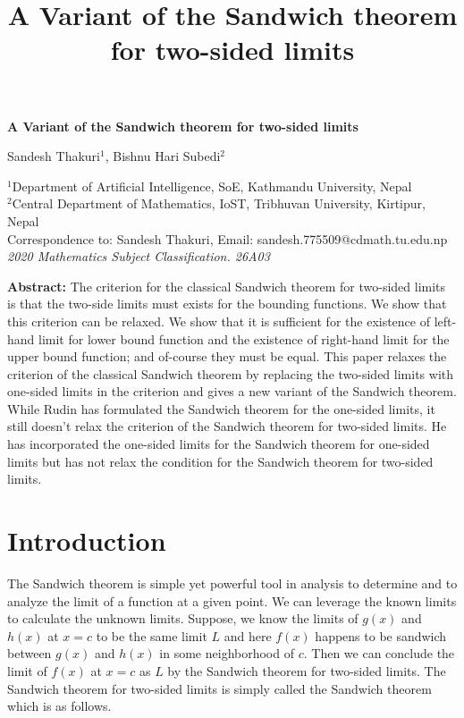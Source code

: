 \documentclass[a4paper,twoside,12pt]{article}
\title{\bfseries A Variant of the Sandwich theorem for two-sided limits}
\theoremstyle{plain}
\theoremstyle{definition}
\begin{document}
\linenumbers
\vspace{2mm}
{\Large
\begin{center}
\bf{\LARGE \bfseries A Variant of the Sandwich theorem for two-sided limits}
\end{center}}
\begin{center}
Sandesh Thakuri$^{1}$, Bishnu Hari Subedi$^{2}$
\end{center}

\begin{center}
{\footnotesize
  $^{1}$Department of Artificial Intelligence, SoE, Kathmandu University, Nepal \\[1mm]
 \(^{2}\)Central Department of Mathematics, IoST, Tribhuvan University, Kirtipur, Nepal \\[2mm]
 Correspondence to: Sandesh Thakuri, Email: sandesh.775509@cdmath.tu.edu.np \\[1mm]
\textit{2020 Mathematics Subject Classification. 26A03}
}
\end{center}

\vspace{5mm}
\noindent
\textbf{Abstract:} {The criterion for the classical Sandwich theorem for two-sided limits is that the two-side limits must exists for the bounding functions. We show that this criterion can be relaxed. We show that it is sufficient for the existence of left-hand limit for lower bound function and the existence of right-hand limit for the upper bound function; and of-course they must be equal. This paper relaxes the criterion of the classical Sandwich theorem by replacing the two-sided limits with one-sided limits in the criterion and gives a new variant of the Sandwich theorem.  While Rudin has formulated the Sandwich theorem for the one-sided limits, it still doesn't relax the criterion of the Sandwich theorem for two-sided limits. He has incorporated the one-sided limits for the Sandwich theorem for one-sided limits but has not relax the condition for the Sandwich theorem for two-sided limits.}
\section{Introduction}
The Sandwich theorem is simple yet powerful tool in analysis to determine and to analyze the limit of a function at a given point. We can leverage the known limits to calculate the unknown limits. Suppose, we know the limits of \(g(x)\) and \(h(x)\) at \(x=c\) to be the same limit \(L\) and here \(f(x)\) happens to be sandwich between \(g(x)\) and \(h(x)\) in some neighborhood of \(c\). Then we can conclude the limit of \(f(x)\) at \(x=c\) as \(L\) by the Sandwich theorem for two-sided limits. The Sandwich theorem for two-sided limits is simply called the Sandwich theorem which is as follows.
\end{document}
